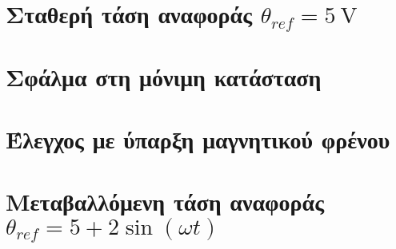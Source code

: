\section[Σταθερή τάση αναφοράς]{Σταθερή τάση αναφοράς $\theta_{ref} = \SI{5}{\volt}$}
\section{Σφάλμα στη μόνιμη κατάσταση}
\section{Έλεγχος με ύπαρξη μαγνητικού φρένου}
\section[Μεταβαλλόμενη τάση αναφοράς]{Μεταβαλλόμενη τάση αναφοράς $\theta_{ref} = 5 + 2 \sin{\left(\omega t\right)}$}

